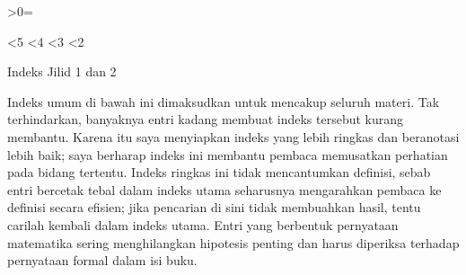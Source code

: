 










\def\chaptername{Indeks}
\def\sectionname{Topik dan hasil utama}
\def\hc{\mathop{\text{hc}}\nolimits}
\def\Krein{Kre\v{\i}n}
\def\med{\mathop{\text{med}}\nolimits}
\def\varinnerprod#1#2{#1\dotproduct#2}
\def\Fn{\mathop{\text{Fn}}\nolimits}

\ifnum\luluvolumeno>0\volumeno=\luluvolumeno\fi

\ifnum\volumeno<5\def\vfive#1{}\else\def\vfive#1{#1}\fi
\ifnum\volumeno<4\def\vfour#1{}\else\def\vfour#1{#1}\fi
\ifnum\volumeno<3\def\vthree#1{}\else\def\vthree#1{#1}\fi
\ifnum\volumeno<2\def\vtwo#1{}\else\def\vtwo#1{#1}\fi

\def\ind{\mathop{\text{ind}}}

\def\indexiiheader#1{\ifnum\volumeno<2{}\else\indexheader{#1}\fi}
\def\indexiiiheader#1{\ifnum\volumeno<3{}\else\indexheader{#1}\fi}
\def\indexivheader#1{\ifnum\volumeno<4{}\else\indexheader{#1}\fi}
\def\indexvheader#1{\ifnum\volumeno<5{}\else\indexheader{#1}\fi}

\indexmedskip


\centerline{\twelvebf Indeks Jilid 1 dan 2}




\indexmedskip






\gdef\bottomparagraph{}
\noindent{\bf\sectionname}
   \smallskip
   \let\headlinesectionname=\sectionname

Indeks umum di bawah ini dimaksudkan untuk mencakup seluruh materi.
Tak terhindarkan, banyaknya entri kadang membuat indeks tersebut kurang membantu.
Karena itu saya menyiapkan indeks yang lebih ringkas dan beranotasi lebih baik;
saya berharap indeks ini membantu pembaca memusatkan perhatian pada bidang
tertentu. Indeks ringkas ini tidak mencantumkan definisi, sebab entri bercetak
tebal dalam indeks utama seharusnya mengarahkan pembaca ke definisi secara
efisien; jika pencarian di sini tidak membuahkan hasil, tentu carilah kembali
dalam indeks utama. Entri yang berbentuk pernyataan matematika sering
menghilangkan hipotesis penting dan harus diperiksa terhadap pernyataan formal
dalam isi buku.

